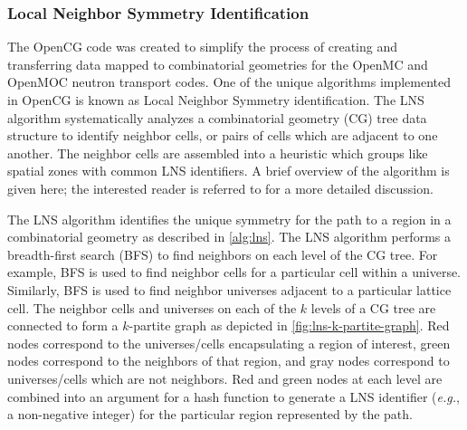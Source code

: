 

\subsubsection{Local Neighbor Symmetry Identification}
\label{subsubsec:homogenize-lns}

The OpenCG code \citep{boyd2015opencg} was created to simplify the process of creating and transferring data mapped to combinatorial geometries for the OpenMC and OpenMOC neutron transport codes. One of the unique algorithms implemented in OpenCG is known as Local Neighbor Symmetry identification. The LNS algorithm systematically analyzes a combinatorial geometry (CG) tree data structure to identify neighbor cells, or pairs of cells which are adjacent to one another. The neighbor cells are assembled into a heuristic which groups like spatial zones with common LNS identifiers. A brief overview of the algorithm is given here; the interested reader is referred to \citep{boyd2015opencg} for a more detailed discussion.

The LNS algorithm identifies the unique symmetry for the path to a region in a combinatorial geometry as described in \autoref{alg:lns}. The LNS algorithm performs a breadth-first search (BFS) to find neighbors on each level of the CG tree. For example, BFS is used to find neighbor cells for a particular cell within a universe. Similarly, BFS is used to find neighbor universes adjacent to a particular lattice cell. The neighbor cells and universes on each of the $k$ levels of a CG tree are connected to form a $k$-partite graph as depicted in \autoref{fig:lns-k-partite-graph}. Red nodes correspond to the universes/cells encapsulating a region of interest, green nodes correspond to the neighbors of that region, and gray nodes correspond to universes/cells which are not neighbors. Red and green nodes at each level are combined into an argument for a hash function to generate a LNS identifier (\textit{e.g.}, a non-negative integer) for the particular region represented by the path.


